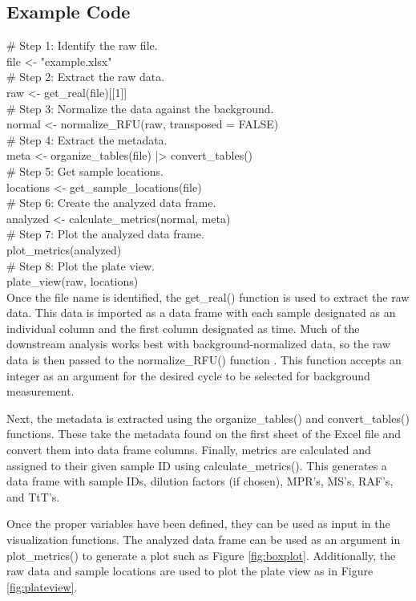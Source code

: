 \documentclass[preprint,12pt,a4paper]{elsarticle}
\begin{document}
\subsection{Example Code}
\# Step 1: Identify the raw file.\\
file <- "example.xlsx"\\
\# Step 2: Extract the raw data.\\
raw <- get\_real(file)[[1]]\\
\# Step 3: Normalize the data against the background.\\
normal <- normalize\_RFU(raw, transposed = FALSE)\\
\# Step 4: Extract the metadata.\\
meta <- organize\_tables(file) |> convert\_tables()\\
\# Step 5: Get sample locations.\\
locations <- get\_sample\_locations(file)\\
\# Step 6: Create the analyzed data frame.\\
analyzed <- calculate\_metrics(normal, meta)\\
\# Step 7: Plot the analyzed data frame.\\
plot\_metrics(analyzed)\\
\# Step 8: Plot the plate view.\\
plate\_view(raw, locations)\\

Once the file name is identified, the get\_real() function is used to extract the raw data. This data is imported as a data frame with each sample designated as an individual column and the first column designated as time. Much of the downstream analysis works best with background-normalized data, so the raw data is then passed to the normalize\_RFU() function \cite{Rowden2023}. This function accepts an integer as an argument for the desired cycle to be selected for background measurement. 

Next, the metadata is extracted using the organize\_tables() and convert\_tables() functions. These take the metadata found on the first sheet of the Excel file and convert them into data frame columns. Finally, metrics are calculated and assigned to their given sample ID using calculate\_metrics(). This generates a data frame with sample IDs, dilution factors (if chosen), MPR's, MS's, RAF's, and TtT's.

Once the proper variables have been defined, they can be used as input in the visualization functions. The analyzed data frame can be used as an argument in plot\_metrics() to generate a plot such as Figure \ref{fig:boxplot}. Additionally, the raw data and sample locations are used to plot the plate view as in Figure \ref{fig:plateview}.
\end{document}
